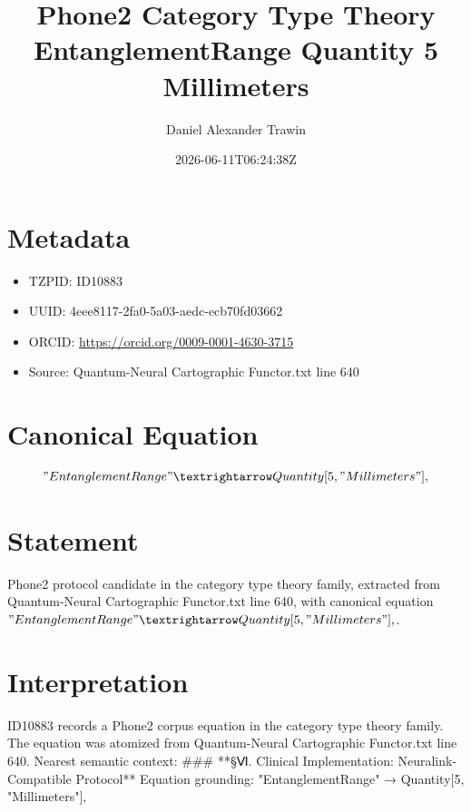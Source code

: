 \documentclass[11pt]{article}
\title{Phone2 Category Type Theory EntanglementRange Quantity 5 Millimeters}
\author{Daniel Alexander Trawin}
\date{2026-06-11T06:24:38Z}
\begin{document}
\maketitle
\section*{Metadata}
\begin{itemize}
\item TZPID: ID10883
\item UUID: 4eee8117-2fa0-5a03-aedc-ecb70fd03662
\item ORCID: \url{https://orcid.org/0009-0001-4630-3715}
\item Source: Quantum-Neural Cartographic Functor.txt line 640
\end{itemize}
\section*{Canonical Equation}
\[
"EntanglementRange" → Quantity[5, "Millimeters"],
\]
\section*{Statement}
Phone2 protocol candidate in the category type theory family, extracted from Quantum-Neural Cartographic Functor.txt line 640, with canonical equation $"EntanglementRange" → Quantity[5, "Millimeters"],$.
\section*{Interpretation}
ID10883 records a Phone2 corpus equation in the category type theory family. The equation was atomized from Quantum-Neural Cartographic Functor.txt line 640. Nearest semantic context: ### **§Ⅵ. Clinical Implementation: Neuralink-Compatible Protocol** Equation grounding: "EntanglementRange" → Quantity[5, "Millimeters"],
\end{document}
